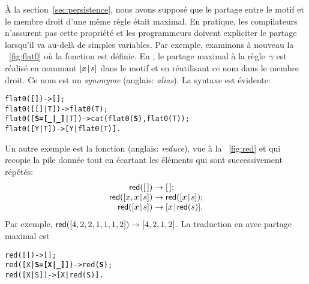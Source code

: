 À la section~\ref{sec:persistence}, nous avons supposé que le partage
entre le motif et le membre droit d'une même règle était maximal. En
pratique, les compilateurs n'assurent pas cette propriété et les
programmeurs doivent expliciter le partage lorsqu'il va au-delà de
simples variables. Par exemple, examinons à nouveau la
\fig~\vref{fig:flat0} où la fonction  est
définie. En \Erlang, le partage maximal à la règle~\(\gamma\) est
réalisé en nommant \([{x}\!\mid\!{s}]\) dans le motif et en réutilisant ce
nom dans le membre droit. Ce nom est un \emph{synonyme} (anglais:
\emph{alias}). La syntaxe est évidente:
\begin{alltt}
flat0(         []) -> [];
flat0(     [[]|T]) -> flat0(T);
flat0([\textbf{S=[\_|\_]}|T]) -> cat(flat0(\textbf{S}),flat0(T));\hfill% \emph{Synonymie}
flat0(      [Y|T]) -> [Y|flat0(T)].
\end{alltt}
  Un
autre exemple est la fonction  (anglais: \emph{reduce}),
vue à la \fig~\vref{fig:red} et qui recopie la pile donnée tout en
écartant les éléments qui sont successivement répétés:
\begin{equation*}
\begin{array}{@{}r@{\;}l@{\;}l@{}}
\fun{red}(\el)           & \rightarrow & \el;\\
\fun{red}(\cons{x,x}{s}) & \rightarrow & \fun{red}(\cons{x}{s});\\
\fun{red}(\cons{x}{s})   & \rightarrow & \cons{x}{\fun{red}(s)}.
\end{array}
\end{equation*}
Par exemple, \(\textsf{red}([4,2,2,1,1,1,2]) \twoheadrightarrow
[4,2,1,2]\). La traduction en \Erlang avec partage maximal est
\begin{alltt}
red(         []) -> [];
red([X|\textbf{S=[X|\_]}]) -> red(\textbf{S});
red(      [X|S]) -> [X|red(S)].
\end{alltt}

